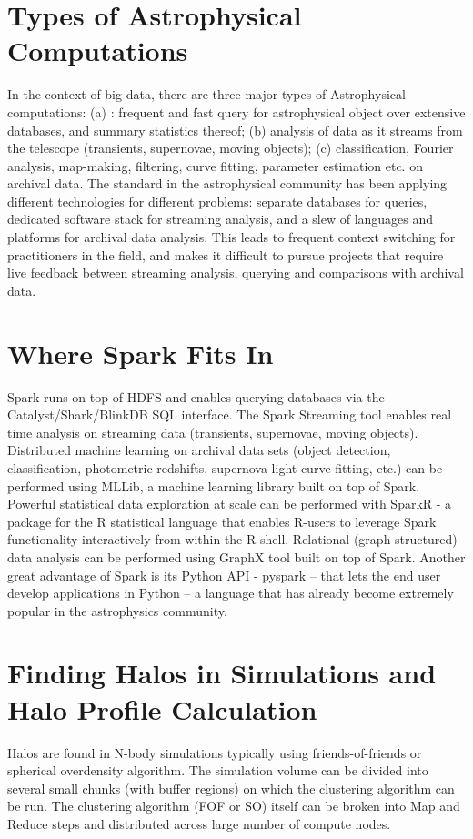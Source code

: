 \documentclass[twocolumn, prd]{revtex4}
\begin{document}
\section{Types of Astrophysical Computations}
In the context of big data, there are three major types of Astrophysical computations: (a) : frequent and fast query for astrophysical object over extensive databases, and summary statistics thereof; 
(b)   analysis of data as it streams from the telescope
(transients, supernovae, moving objects); (c)  classification, Fourier analysis, 
map-making, filtering, curve fitting, parameter estimation etc. on archival data. The standard in the astrophysical community has been applying different technologies for different problems: separate databases for queries, dedicated software stack for streaming analysis, and a slew of languages and platforms for archival data analysis.  This leads to frequent context switching for practitioners in the field, and makes it difficult to pursue projects that require live feedback between streaming analysis, querying and comparisons with archival data.  

\section{Where Spark Fits In}
Spark runs on top of  HDFS and enables querying databases via the Catalyst/Shark/BlinkDB SQL interface. The Spark Streaming tool enables real time analysis on streaming data (transients, supernovae, moving objects). Distributed machine learning  on archival  data sets (object detection, classification, photometric redshifts, supernova light curve fitting, etc.) can be performed using  MLLib,  a machine learning library built on top of Spark. Powerful statistical data exploration at scale can be performed with SparkR - a package for the R statistical language that enables R-users to leverage Spark functionality interactively from within the R shell. Relational (graph structured) data analysis can be performed using GraphX tool built on top of Spark.  Another great advantage of Spark is its Python API - pyspark -- that lets the end user develop applications in Python  -- a language that has already become extremely popular in  the astrophysics community. 

\section{Finding Halos in Simulations and Halo Profile Calculation}
Halos are found in N-body simulations typically using friends-of-friends or spherical overdensity algorithm. The simulation volume can be divided into several small chunks (with buffer regions) on which the clustering algorithm can be run. The clustering algorithm (FOF or SO) itself can be broken into Map and Reduce steps and distributed across large number of compute nodes. 
\end{document}
